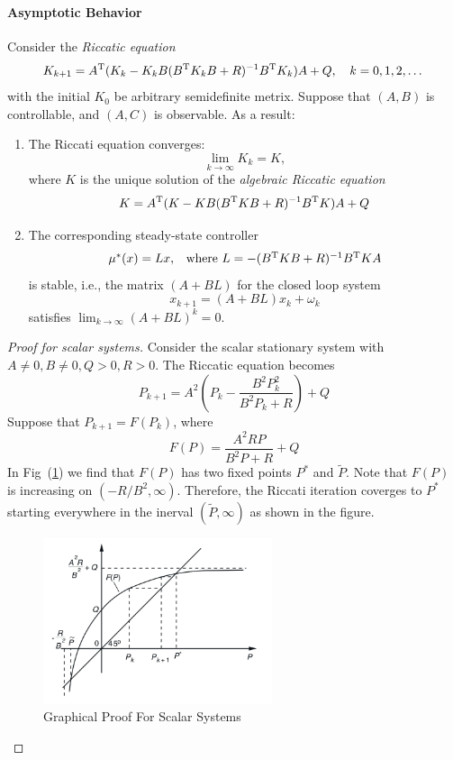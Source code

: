 \paragraph{Asymptotic Behavior}
\begin{theorem}
Consider the \emph{Riccatic equation}
\[
K_{k+1} = A^{\mathrm T}(K_k - K_kB(B^{\mathrm T} K_kB+R)^{-1}B^{\mathrm T} K_k)A+Q,\quad
k=0,1,2,\dots
\]
with the initial $K_0$ be arbitrary semidefinite metrix.
Suppose that $(A,B)$ is controllable, and $(A,C)$ is observable. As a result:
\begin{enumerate}
\item
The Riccati equation converges:
\[
\lim_{k\to\infty}K_k = K,
\]
where $K$ is the unique solution of the \emph{algebraic Riccatic equation}
\[
K = A^{\mathrm T}(K - KB(B^{\mathrm T} KB+R)^{-1}B^{\mathrm T} K)A+Q
\]
\item
The corresponding steady-state controller 
\[
\begin{array}{ll}
\mu^*(x) = Lx,
&
\text{where }L = -(B^{\mathrm T} KB+R)^{-1}B^{\mathrm T} KA
\end{array}
\]
is stable, i.e., the matrix $(A+BL)$ for the closed loop system
\[
x_{k+1} = (A+BL)x_k+\omega_k
\]
satisfies $\lim_{k\to\infty}(A+BL)^k=0$.
\end{enumerate}
\end{theorem}
\begin{proof}[Proof for scalar systems]
Consider the scalar stationary system with $A\ne 0,B\ne0,Q>0,R>0$.
The Riccatic equation becomes
\[
P_{k+1} = A^2\left(P_k - \frac{B^2P^2_k}{B^2P_k +R}\right)+Q
\]
Suppose that $P_{k+1} = F(P_k)$, where
\[
F(P) = \frac{A^2RP}{B^2P+R}+Q
\]
In Fig~(\ref{fig:3:1}) we find that $F(P)$ has two fixed points $P^*$ and $\tilde{P}$. Note that $F(P)$ is increasing on $(-R/B^2,\infty)$. Therefore, the Riccati iteration coverges to $P^*$ starting everywhere in the inerval $(\tilde{P},\infty)$ as shown in the figure.
\begin{figure}
\centering
\includegraphics[width=0.6\textwidth]{Forth_lecture/p_6}
\caption{Graphical Proof For Scalar Systems}
\label{fig:3:1}
\end{figure}
\end{proof}
